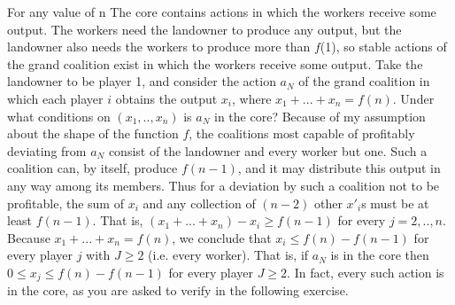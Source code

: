 \begin{example}
                For any value of n The core contains actions in which the workers receive some output.
                The workers need the landowner to produce any output, but the landowner
                also needs the workers to produce more than $f$(1), so stable actions of the grand coalition exist in which the
                workers receive some output. Take the landowner to be player 1, and consider the action $a_{N}$ of the grand
                coalition in which each player $i$ obtains the output $x_{i}$, where $x_{1}+...+x_{n}=f(n)$. Under what conditions
                on  $(x_{1},..,x_{n})$ is $a_{N}$ in the core? Because of my assumption about the shape of the function $f$, the
                coalitions most capable of profitably deviating from $a_{N}$ consist of the landowner and every worker but one.
                Such a coalition can, by itself, produce $f(n-1)$, and it may distribute this output in any way among its members.
                Thus for a deviation by such a coalition not to be profitable, the sum of $x_{i}$ and any collection of $(n-2)$ other
                $x'_{i}$s must be at least $f(n-1)$. That is, $(x_{1}+...+x_{n})-x_{i}\geq f(n-1)$ for every $j=2,..,n$. Because
                $x_{1}+...+x_{n}=f(n)$, we conclude that $x_{i}\leq f(n)-f(n-1)$ for every player $j$ with $J\geq 2$ (i.e. every worker).
                That is, if $a_{N}$ is in the core then $0\leq x_{j}\leq f(n)-f(n-1)$ for every player $J\geq 2$. In fact, every such action
                is in the core, as you are asked to verify in the following exercise.

            \end{example}



